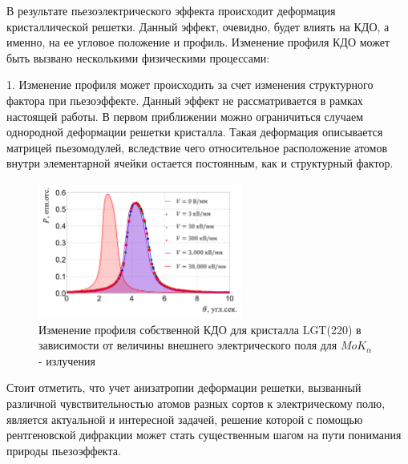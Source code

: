 В результате пьезоэлектрического эффекта происходит деформация
кристаллической решетки. Данный эффект, очевидно, будет влиять на
КДО, а именно, на ее угловое положение и профиль.
Изменение профиля КДО может быть вызвано несколькими физическими процессами:

1. Изменение профиля может происходить за счет изменения структурного фактора при
пьезоэффекте. Данный эффект не рассматривается в рамках настоящей работы.
В первом приближении можно ограничиться случаем однородной деформации решетки
 кристалла. Такая деформация описывается
 матрицей пьезомодулей, вследствие чего относительное расположение атомов
 внутри элементарной ячейки остается постоянным, как и структурный фактор.

 \begin{figure}[H]
   \centering
   \includegraphics[width=0.6\textwidth]{images/self_kdo_under_ex_field.png}
   \caption{Изменение профиля собственной КДО для кристалла LGT(220)
   в зависимости от величины внешнего электрического поля для  $MoK_{\alpha}$ - излучения}
   \label{ris:self_kdo_deformation}
 \end{figure}

Стоит отметить, что учет анизатропии деформации решетки, вызванный различной чувствительностью
атомов разных сортов к электрическому полю, является актуальной и интересной задачей,
решение которой с помощью рентгеновской дифракции может стать существенным шагом
на пути понимания природы пьезоэффекта.

